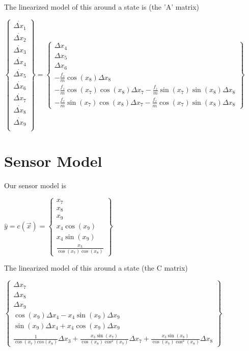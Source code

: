 \documentclass[12pt]{article}
\begin{document}
The linearized model of this around a state is (the 'A' matrix)
\begin{center}
$
\begin{Bmatrix}
\dot{\Delta x_{1}}\\
\dot{\Delta x_{2}}\\
\dot{\Delta x_{3}}\\
\dot{\Delta x_{4}}\\
\dot{\Delta x_{5}}\\
\dot{\Delta x_{6}}\\
\dot{\Delta x_{7}}\\
\dot{\Delta x_{8}}\\
\dot{\Delta x_{9}}\\
\end{Bmatrix}
=
\begin{Bmatrix}
\Delta x_{4}\\
\Delta x_{5}\\
\Delta x_{6}\\
-\frac{f_z}{m}\cos(x_8) \Delta x_8\\
-\frac{f_z}{m}\cos(x_7)\cos(x_8)\Delta x_7 -\frac{f_z}{m}\sin(x_7)\sin(x_8)\Delta x_8\\
-\frac{f_z}{m}\sin(x_7)\cos(x_8)\Delta x_7
-\frac{f_z}{m}\cos(x_7)\sin(x_8)\Delta x_8
\end{Bmatrix}
$
\end{center}

\section{Sensor Model}
Our sensor model is
\begin{center}
$
\hat{y} = c(\vec{x}) =
\begin{Bmatrix}
x_7 \\
x_8 \\
x_9 \\
x_4 \cos(x_9) \\
x_4 \sin(x_9) \\
\frac{x_3}{\cos(x_7)\cos(x_8)}
\end{Bmatrix}
$
\end{center}
The linearized model of this around a state (the C matrix)
\begin{center}
$
\begin{Bmatrix}
\Delta x_7\\
\Delta x_8\\
\Delta x_9\\
\cos(x_9)\Delta x_4 - x_4 \sin(x_9) \Delta x_9\\
\sin(x_9)\Delta x_4 + x_4 \cos(x_9) \Delta x_9\\
\frac{1}{\cos(x_7)cos(x_8)}\Delta x_3 +
\frac{x_3\sin(x_7)}{\cos(x_8)\cos^2(x_7)}\Delta x_7 +
\frac{x_3\sin(x_8)}{\cos(x_7)\cos^2(x_8)}\Delta x_8
\end{Bmatrix}
$
\end{center}
\end{document}
